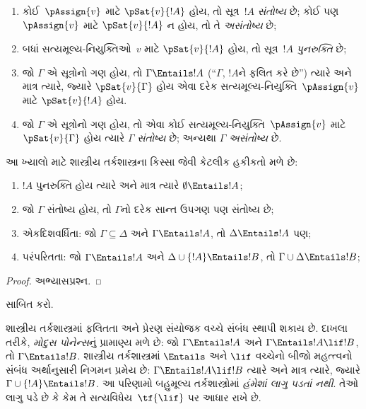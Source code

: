 \begin{defn}
\begin{enumerate}
\item કોઈ~$\pAssign{v}$ માટે $\pSat{v}{!A}$ હોય, તો
  સૂત્ર~$!A$ \emph{સંતોષ્ય} છે; કોઈ પણ $\pAssign{v}$ માટે
  $\pSat{v}{!A}$ ન હોય, તો તે \emph{અસંતોષ્ય} છે;
\item બધાં સત્યમૂલ્ય-નિયુક્તિઓ~$v$ માટે $\pSat{v}{!A}$ હોય, તો
  સૂત્ર~$!A$ \emph{પુનરુક્તિ} છે;
\item જો $\Gamma$ એ સૂત્રોનો ગણ હોય, તો $\Gamma \Entails !A$
  (``$\Gamma$, $!A$ને ફલિત કરે છે'') ત્યારે અને માત્ર ત્યારે, જ્યારે
  $\pSat{v}{\Gamma}$ હોય એવા દરેક સત્યમૂલ્ય-નિયુક્તિ~$\pAssign{v}$ માટે
  $\pSat{v}{!A}$ હોય.
\item જો $\Gamma$ એ સૂત્રોનો ગણ હોય, તો એવા કોઈ
  સત્યમૂલ્ય-નિયુક્તિ~$\pAssign{v}$ માટે $\pSat{v}{\Gamma}$ હોય ત્યારે
  $\Gamma$ \emph{સંતોષ્ય} છે; અન્યથા $\Gamma$ \emph{અસંતોષ્ય} છે.
\end{enumerate}
\end{defn}

આ ખ્યાલો માટે શાસ્ત્રીય તર્કશાસ્ત્રના કિસ્સા જેવી કેટલીક હકીકતો મળે છે:

\begin{prop}
\begin{enumerate}
\item $!A$ પુનરુક્તિ હોય ત્યારે અને માત્ર ત્યારે
  $\emptyset \Entails !A$;
\item જો $\Gamma$ સંતોષ્ય હોય, તો $\Gamma$નો દરેક સાન્ત ઉપગણ પણ
  સંતોષ્ય છે;
\item{}%
એકદિશવર્ધિતા: જો $\Gamma \subseteq \Delta$
  અને $\Gamma \Entails !A$, તો $\Delta \Entails !A$ પણ;
\item{}%
પરંપરિતતા: જો $\Gamma \Entails !A$ અને
  $\Delta \cup \{ !A\} \Entails !B$, તો $\Gamma \cup \Delta \Entails
  !B$;
\end{enumerate}
\end{prop}

\begin{proof}
અભ્યાસપ્રશ્ન.
\end{proof}

\begin{prob}
 સાબિત કરો.
\end{prob}

શાસ્ત્રીય તર્કશાસ્ત્રમાં ફલિતતા અને પ્રેરણ સંયોજક વચ્ચે સંબંધ સ્થાપી શકાય છે.
દાખલા તરીકે, \emph{મોદુસ પોનેન્સ}નું પ્રામાણ્ય મળે છે: જો $\Gamma
\Entails !A$ અને $\Gamma \Entails !A \lif !B$, તો $\Gamma \Entails
!B$. શાસ્ત્રીય તર્કશાસ્ત્રમાં $\Entails$ અને $\lif$ વચ્ચેનો બીજો
મહત્ત્વનો સંબંધ અર્થાનુસારી નિગમન પ્રમેય છે: $\Gamma \Entails !A
\lif !B$ ત્યારે અને માત્ર ત્યારે, જ્યારે $\Gamma \cup \{!A\} \Entails
!B$. આ પરિણામો બહુમૂલ્ય તર્કશાસ્ત્રોમાં \emph{હંમેશાં લાગુ પડતાં નથી}.
તેઓ લાગુ પડે છે કે કેમ તે સત્યવિધેય~$\tf{\lif}$ પર આધાર રાખે છે.
\endgroup


